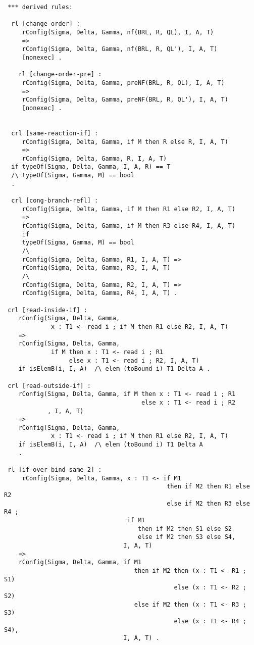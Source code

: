 \begin{lstlisting}
 *** derived rules:
  
  rl [change-order] :
     rConfig(Sigma, Delta, Gamma, nf(BRL, R, QL), I, A, T)
     =>
     rConfig(Sigma, Delta, Gamma, nf(BRL, R, QL'), I, A, T) 
     [nonexec] . 
     
    rl [change-order-pre] :
     rConfig(Sigma, Delta, Gamma, preNF(BRL, R, QL), I, A, T)
     =>
     rConfig(Sigma, Delta, Gamma, preNF(BRL, R, QL'), I, A, T) 
     [nonexec] . 
    
 
  crl [same-reaction-if] : 
     rConfig(Sigma, Delta, Gamma, if M then R else R, I, A, T)
     => 
     rConfig(Sigma, Delta, Gamma, R, I, A, T) 
  if typeOf(Sigma, Delta, Gamma, I, A, R) == T  
  /\ typeOf(Sigma, Gamma, M) == bool 
  .
 
  crl [cong-branch-refl] : 
     rConfig(Sigma, Delta, Gamma, if M then R1 else R2, I, A, T)
     => 
     rConfig(Sigma, Delta, Gamma, if M then R3 else R4, I, A, T)
     if
     typeOf(Sigma, Gamma, M) == bool 
     /\
     rConfig(Sigma, Delta, Gamma, R1, I, A, T) => 
     rConfig(Sigma, Delta, Gamma, R3, I, A, T)
     /\
     rConfig(Sigma, Delta, Gamma, R2, I, A, T) => 
     rConfig(Sigma, Delta, Gamma, R4, I, A, T) . 
      
 crl [read-inside-if] : 
    rConfig(Sigma, Delta, Gamma, 
             x : T1 <- read i ; if M then R1 else R2, I, A, T) 
    => 
    rConfig(Sigma, Delta, Gamma, 
             if M then x : T1 <- read i ; R1 
                  else x : T1 <- read i ; R2, I, A, T) 
    if isElemB(i, I, A)  /\ elem (toBound i) T1 Delta A .
   
 crl [read-outside-if] : 
    rConfig(Sigma, Delta, Gamma, if M then x : T1 <- read i ; R1 
                                      else x : T1 <- read i ; R2
            , I, A, T) 
    => 
    rConfig(Sigma, Delta, Gamma, 
             x : T1 <- read i ; if M then R1 else R2, I, A, T) 
    if isElemB(i, I, A)  /\ elem (toBound i) T1 Delta A
    .
                    
 rl [if-over-bind-same-2] :
     rConfig(Sigma, Delta, Gamma, x : T1 <- if M1 
                                             then if M2 then R1 else R2
                                             else if M2 then R3 else R4 ;
                                  if M1 
                                     then if M2 then S1 else S2
                                     else if M2 then S3 else S4,
                                 I, A, T)
    => 
    rConfig(Sigma, Delta, Gamma, if M1 
                                    then if M2 then (x : T1 <- R1 ; S1) 
                                               else (x : T1 <- R2 ; S2)
                                    else if M2 then (x : T1 <- R3 ; S3) 
                                               else (x : T1 <- R4 ; S4),          
                                 I, A, T) .                             
           

\end{lstlisting}
